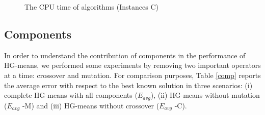 \begin{figure}[H]
\caption{The CPU time of algorithms (Instances C)}
\label{fig:timeC}
\end{figure}

\subsection{Components}
\label{sec:components-section}
In order to understand the contribution of components in the performance of HG-means, we performed some experiments by removing two important operators at a time: crossover and mutation. For comparison purposes, Table \ref{comp} reports the average error with respect to the best known solution in three scenarios: (i) complete HG-means with all components ($E_{avg}$), (ii) HG-means without mutation ($E_{avg}$ -M) and (iii) HG-means without crossover ($E_{avg}$ -C).

